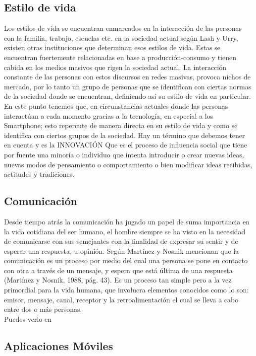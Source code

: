 	\subsection{Estilo de vida}
	Los estilos de vida se encuentran enmarcados en la interacción de las personas con la familia, trabajo, escuelas etc. en la sociedad actual según Lash y Urry, existen otras instituciones que determinan esos estilos de vida. Estas se encuentran fuertemente relacionadas en base a producción-consumo y tienen cabida en los medios masivos que rigen la sociedad actual. La interacción constante de las personas con estos discursos en redes masivas, provoca nichos de mercado, por lo tanto un grupo de personas que se identifican con ciertas normas de la sociedad donde se encuentran, definiendo así su estilo de vida en particular. En este punto tenemos que, en circunstancias actuales donde las personas interactúan a cada momento gracias a la tecnología, en especial a los Smartphone; esto repercute de manera directa en su estilo de vida y como se identifica con ciertos grupos de la sociedad. Hay un término que debemos tener en cuenta y es la INNOVACIÓN Que es el proceso de influencia social que tiene por fuente una minoría o individuo que intenta introducir o crear nuevas ideas, nuevas modos de pensamiento o comportamiento o bien modificar ideas recibidas, actitudes y tradiciones.
	\subsection{Comunicación}
	Desde tiempo atrás la comunicación ha jugado un papel de suma importancia en la vida cotidiana del ser humano, el hombre siempre se ha visto en la necesidad de comunicarse con sus semejantes con la finalidad de expresar su sentir y de esperar una respuesta, u opinión. Según Martínez y Nosnik mencionan que la comunicación es un proceso por medio del cual una persona se pone en contacto con otra a través de un mensaje, y espera que está última de una respuesta (Martínez y Nosnik, 1988, pág. 43). Es un proceso tan simple pero a la vez primordial para la vida humana, que involucra elementos conocidos como lo son: emisor, mensaje, canal, receptor y la retroalimentación el cual se lleva a cabo entre dos o más personas.\\
	
	Puedes verlo en \cite{INFLUENCIA}
	
	\subsection{Aplicaciones Móviles}
	
